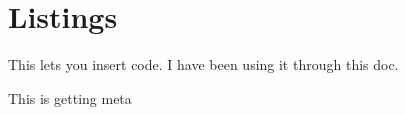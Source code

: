 \section{Listings}
This lets you insert code. I have been using it through this doc.


\bigskip
This is getting meta

